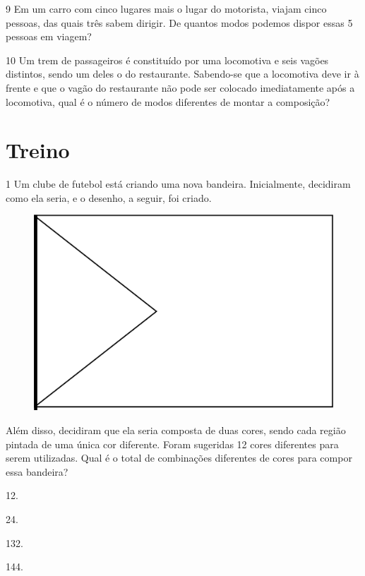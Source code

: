 
\num{9} Em um carro com cinco lugares mais o lugar do motorista, viajam cinco pessoas,
das quais três sabem dirigir. De quantos modos podemos dispor essas 5
pessoas em viagem?


\num{10} Um trem de passageiros é constituído por uma locomotiva e seis vagões
distintos, sendo um deles o do restaurante. Sabendo-se que a locomotiva deve ir
à frente e que o vagão do restaurante não pode ser colocado imediatamente
após a locomotiva, qual é o número de modos diferentes de montar a
composição?


\pagebreak
\section*{Treino}

\num{1} Um clube de futebol está criando uma nova bandeira.
Inicialmente, decidiram como ela seria, e o desenho, a seguir, foi criado.

\begin{figure}[htpb!]
\centering
\includegraphics[width=.2\textwidth]{media/image74.png}
\end{figure}

Além disso, decidiram que ela seria composta de duas cores, sendo cada
região pintada de uma única cor diferente. Foram sugeridas 12 cores
diferentes para serem utilizadas. Qual é o total de combinações
diferentes de cores para compor essa bandeira?

\begin{multicols}{2}
\begin{escolha}
\item
  12.
\item
  24.
\item
  132.
\item
  144.
\end{escolha}
\end{multicols}

